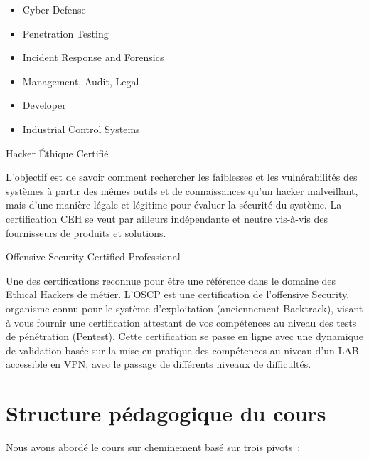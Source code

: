 \begin{itemize}
  \item Cyber Defense
  \item Penetration Testing
  \item Incident Response and Forensics
  \item Management, Audit, Legal
  \item Developer
  \item Industrial Control Systems

\end{itemize}


 Hacker Éthique Certifié 

L'objectif est de savoir comment rechercher les faiblesses et les vulnérabilités des systèmes  à partir des mêmes outils et de connaissances qu’un hacker malveillant, mais d’une manière légale et légitime pour évaluer la sécurité du système. La certification CEH se veut par ailleurs indépendante et neutre vis-à-vis des fournisseurs de produits et solutions.

 Offensive Security Certified Professional


Une des certifications reconnue pour être une référence dans le domaine des Ethical Hackers de métier. L’OSCP est une certification de l’offensive Security, organisme connu pour le système d’exploitation   (anciennement Backtrack), visant à vous fournir une certification attestant de vos compétences au niveau des tests de pénétration (Pentest). Cette certification se passe en ligne avec une dynamique de validation basée sur la mise en pratique des compétences au niveau d’un LAB accessible en VPN, avec le passage de différents niveaux de difficultés.
\section {Structure pédagogique du cours}
Nous avons abordé le cours sur cheminement basé sur trois pivots :

